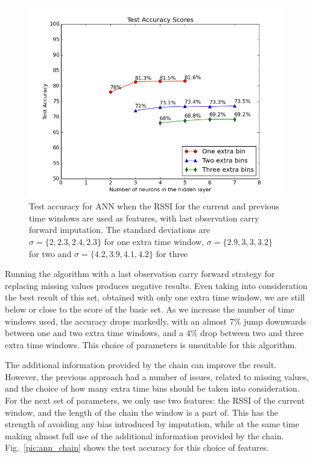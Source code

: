 \begin{figure}[h]
	\begin{center}
		\includegraphics[scale=0.6]{figures/ann_params1.png}
	\end{center}
	
	\caption{Test accuracy for ANN when the RSSI for the current and previous time windows are used as features, with last observation carry forward imputation. The standard deviations are $\sigma=\lbrace 2,2.3,2.4,2.3 \rbrace $ for one extra time window, $\sigma=\lbrace 2.9,3,3,3.2 \rbrace $ for two and $\sigma=\lbrace 4.2,3.9,4.1,4.2 \rbrace $ for three}
	\label{pic:ann_params2}

\end{figure}

Running the algorithm with a last observation carry forward strategy for replacing missing values produces negative results. Even taking into consideration the best result of this set, obtained with only one extra time window, we are still below or close to the score of the basic set.  As we increase the number of time windows used, the accuracy drops markedly, with an almost 7\% jump downwards between one and two extra time windows, and a 4\% drop between two and three extra time windows. This choice of parameters is unsuitable for this algorithm.    

The additional information provided by the chain can improve the result. However, the previous approach had a number of issues, related to missing values, and the choice of how many extra time bins should be taken into consideration. For the next set of parameters, we only use two features: the RSSI of the current window, and the length of the chain the window is a part of. This has the strength of avoiding any bias introduced by imputation, while at the same time making almost full use of the additional information provided by the chain. Fig.~\ref{pic:ann_chain} shows the test accuracy for this choice of features.

